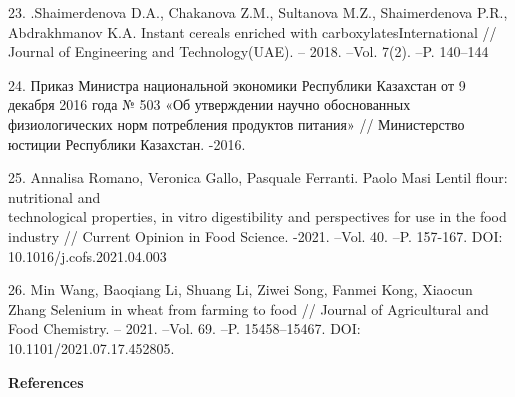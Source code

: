 \begin{noparindent}
23. .Shaimerdenova D.A., Chakanova Z.M., Sultanova M.Z., Shaimerdenova
P.R., Abdrakhmanov K.A. Instant cereals enriched with
carboxylatesInternational // Journal of Engineering and Technology(UAE).
-- 2018. --Vol. 7(2). --P. 140--144

24. Приказ Министра национальной экономики Республики Казахстан от 9
декабря 2016 года № 503 «Об утверждении научно обоснованных
физиологических норм потребления продуктов питания» // Министерство
юстиции Республики Казахстан. -2016.

25. Annalisa Romano, Veronica Gallo, Pasquale Ferranti. Paolo Masi
Lentil flour: nutritional and \\technological properties, in vitro
digestibility and perspectives for use in the food industry // Current
Opinion in Food Science. -2021. --Vol. 40. --P. 157-167. DOI:
10.1016/j.cofs.2021.04.003

26. Min Wang, Baoqiang Li, Shuang Li, Ziwei Song, Fanmei Kong, Xiaocun
Zhang Selenium in wheat from farming to food // Journal of Agricultural
and Food Chemistry. -- 2021. --Vol. 69. --P. 15458--15467. DOI:
10.1101/2021.07.17.452805.

\end{noparindent}

\begin{center}
{\bfseries References}
\end{center}

